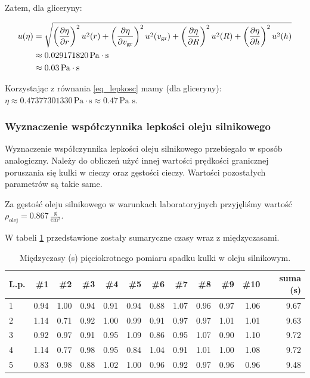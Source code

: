 \documentclass[a4paper]{article}
\begin{document}
Zatem, dla gliceryny:

\begin{align*}
	u(\eta) &= \sqrt{
	  \left(\frac{\partial \eta}{\partial r}\right)^2 u^2(r)
	+ \left(\frac{\partial \eta}{\partial v_{\text{gr}}}\right)^2 u^2(v_{\text{gr}})
	+ \left(\frac{\partial \eta}{\partial R}\right)^2 u^2(R)
	+ \left(\frac{\partial \eta}{\partial h}\right)^2 u^2(h)
	} \\
	&\approx 0.029171820 \, \text{Pa} \cdot \text{s}\\
	&\approx 0.03 \, \text{Pa} \cdot \text{s}
\end{align*}

Korzystając z równania \ref{eq_lepkosc} mamy (dla gliceryny): $\eta \approx 0.47377301330 \, \text{Pa} \cdot \text{s} \approx 0.47 \, \text {Pa s}$.

\subsubsection{Wyznaczenie współczynnika lepkości oleju silnikowego}

Wyznaczenie współczynnika lepkości oleju silnikowego przebiegało w sposób analogiczny.
Należy do obliczeń użyć innej wartości prędkości granicznej poruszania się kulki w cieczy oraz gęstości cieczy.
Wartości pozostałych parametrów są takie same.

Za gęstość oleju silnikowego w warunkach laboratoryjnych przyjęliśmy wartość $\rho_\text{olej} = 0.867 \, \frac{\text{g}}{\text{cm}^3}$.

W tabeli \ref{olej} przedstawione zostały sumaryczne czasy wraz z międzyczasami.

\begin{table}[h!]
	\centering
	\begin{tabular}{lrrrrrrrrrrr}
		\toprule
		L.p. &  \#1 &  \#2 &  \#3 &  \#4 &  \#5 &  \#6 &  \#7 &  \#8 &  \#9 &  \#10 & suma (s)\\
		\midrule
		1 &           0.94 &           1.00 &           0.94 &           0.91 &           0.94 &           0.88 &           1.07 &           0.96 &           0.97 &            1.06 & 9.67 \\
		2 &           1.14 &           0.71 &           0.92 &           1.00 &           0.99 &           0.91 &           0.97 &           0.97 &           1.01 &            1.01 & 9.63 \\
		3 &           0.92 &           0.97 &           0.91 &           0.95 &           1.09 &           0.86 &           0.95 &           1.07 &           0.90 &            1.10 & 9.72 \\
		4 &           1.14 &           0.77 &           0.98 &           0.95 &           0.84 &           1.04 &           0.91 &           1.01 &           1.00 &            1.08 & 9.72 \\
		5 &           0.83 &           0.98 &           0.88 &           1.02 &           1.00 &           0.96 &           0.92 &           0.97 &           0.96 &            0.96 & 9.48 \\
		\bottomrule
		\end{tabular}
	\caption{Międzyczasy (s) pięciokrotnego pomiaru spadku kulki w oleju silnikowym.}
	\label{olej}
\end{table}
\end{document}
